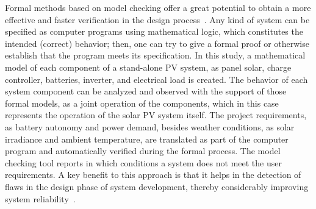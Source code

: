 \documentclass[review]{elsarticle}
\begin{document}
Formal methods based on model checking offer a great potential to obtain a more effective and faster verification in the design process~\cite{ClarkeHV18}.  
Any kind of system can be specified as computer programs using mathematical logic, which constitutes the intended (correct) behavior; then, one can try to give a formal proof or otherwise establish that the program meets its specification. %
%
%
%
%
In this study, a mathematical model of each component of a stand-alone PV system, as panel solar, charge controller, batteries, inverter, and electrical load is created. The behavior of each system component can be analyzed and observed with the support of those formal models, as a joint operation of the components, which in this case represents the operation of the solar PV system itself. The project requirements, as battery autonomy and power demand, besides weather conditions, as solar irradiance and ambient temperature, are translated as part of the computer program and automatically verified during the formal process. The model checking tool reports in which conditions a system does not meet the user requirements. A key benefit to this approach is that it helps in the detection of flaws in the design phase of system development, thereby considerably improving system reliability~\cite{Akram2018}. 
\end{document}
